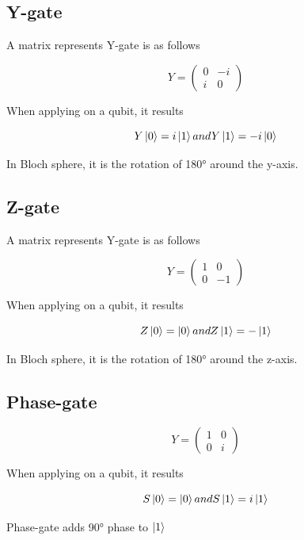 \documentclass[11pt]{article}
\begin{document}
    \subsection{Y-gate}\label{subsec:y-gate}

    A matrix represents Y-gate is as follows

    \[
        Y = \begin{pmatrix}
                0 & -i \\
                i & 0
        \end{pmatrix}
    \]

    When applying on a qubit, it results

    \[
        Y\ket{0} = i\ket{1} and
        Y\ket{1} = -i\ket{0}
    \]

    In Bloch sphere, it is the rotation of 180° around the y-axis.

    \subsection{Z-gate}\label{subsec:z-gate}

    A matrix represents Y-gate is as follows

    \[
        Y = \begin{pmatrix}
                1 & 0 \\
                0 & -1
        \end{pmatrix}
    \]

    When applying on a qubit, it results

    \[
        Z\ket{0} = \ket{0} and
        Z\ket{1} = -\ket{1}
    \]

    In Bloch sphere, it is the rotation of 180° around the z-axis.

    \subsection{Phase-gate}\label{subsec:phase-gate}

    \[
        Y = \begin{pmatrix}
                1 & 0 \\
                0 & i
        \end{pmatrix}
    \]

    When applying on a qubit, it results

    \[
        S\ket{0} = \ket{0} and
        S\ket{1} = i\ket{1}
    \]

    Phase-gate adds 90° phase to $\ket{1}$
\end{document}
